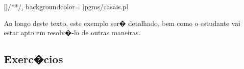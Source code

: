 \documentclass[final,a4paper]{article}
\begin{document}
[\color{blue}]{/*}{*/}, %
              backgroundcolor=\color{yellow}  %
		 ]{pgms/casais.pl}
		 
Ao longo deste texto, este exemplo ser�
detalhado, bem como o estudante vai estar
apto em resolv�-lo de  outras maneiras.

\newpage
\subsection{Exerc�cios}
\end{document}
